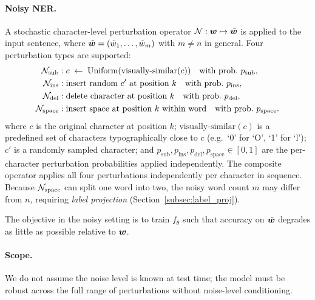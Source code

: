 \paragraph{Noisy NER.}
A stochastic character-level perturbation operator
$\mathcal{N} : \bm{w} \mapsto \tilde{\bm{w}}$ is applied to the input sentence, where
$\tilde{\bm{w}} = (\tilde{w}_1, \ldots, \tilde{w}_m)$ with $m \neq n$ in
general.  Four perturbation types are supported:
\begin{align}
  \mathcal{N}_{\text{sub}}   &: c \;\leftarrow\; \text{Uniform}(\text{visually-similar}(c))
                        \quad \text{with prob.}\ p_{\text{sub}}, \label{eq:nsub}\\
  \mathcal{N}_{\text{ins}}   &: \text{insert random } c' \text{ at position } k
                        \quad \text{with prob.}\ p_{\text{ins}}, \label{eq:nins}\\
  \mathcal{N}_{\text{del}}   &: \text{delete character at position } k
                        \quad \text{with prob.}\ p_{\text{del}}, \label{eq:ndel}\\
  \mathcal{N}_{\text{space}} &: \text{insert space at position } k \text{ within word}
                        \quad \text{with prob.}\ p_{\text{space}}. \label{eq:nspace}
\end{align}
\noindent where $c$ is the original character at position $k$; $\text{visually-similar}(c)$ is a predefined set of characters typographically close to $c$ (e.g.\ `0' for `O', `1' for `l'); $c'$ is a randomly sampled character; and $p_{\text{sub}}, p_{\text{ins}}, p_{\text{del}}, p_{\text{space}} \in [0,1]$ are the per-character perturbation probabilities applied independently. The composite operator applies all four perturbations independently per
character in sequence.  Because $\mathcal{N}_{\text{space}}$ can split one word into
two, the noisy word count $m$ may differ from $n$, requiring \emph{label
projection} (Section~\ref{subsec:label_proj}).

The objective in the noisy setting is to train $f_\theta$ such that accuracy
on $\tilde{\bm{w}}$ degrades as little as possible relative to $\bm{w}$.

\paragraph{Scope.}
We do not assume the noise level is known at test time; the model must be
robust across the full range of perturbations without noise-level
conditioning.
